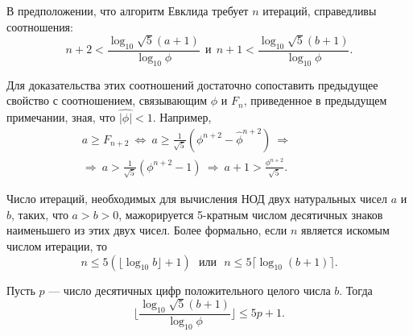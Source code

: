 \begin{property}
\hspace*{15pt}В предположении, что алгоритм Евклида требует $n$ итераций,  
справедливы соотношения: 
\begin{equation*}
n+2 < \frac{\log_{10}{\sqrt{5}(a+1)}}{\log_{10}{\phi}}\:\: \text{и} \:\: n+1 < \frac{\log_{10}{\sqrt{5}(b+1)}}{\log_{10}{\phi}}.
\end{equation*}
\end{property}

\begin{myproof}
Для доказательства этих соотношений достаточно сопоставить 
предыдущее свойство с соотношением, связывающим $\phi$ и $F_n$,  
приведенное в предыдущем примечании, зная, что $\hat{|\phi|} < 1$. Например, 
\begin{eqnarray*}
a \geqslant F_{n+2}\: \Leftrightarrow \: a \geqslant \frac{1}{\sqrt{5}}(\phi^{n+2} - \hat{\phi}^{n+2}) \: \Rightarrow \qquad\qquad \\
\Rightarrow \: a > \frac{1}{\sqrt{5}}(\phi^{n+2} - 1) \: \Rightarrow \: a+1 > \frac{\phi^{n+2}}{\sqrt{5}}.
\end{eqnarray*}
\end{myproof}

\begin{thm}[Ламе]
\hspace*{15pt}Число итераций, необходимых для вычисления $\text{НОД}$ двух  
натуральных чисел $a$ и $b$, таких, что $a > b > 0$, мажорируется 5-кратным числом 
десятичных знаков наименьшего из этих двух чисел. Более формально, 
если $n$ является искомым числом итерации, то
\begin{equation*}
n \leqslant 5(\lfloor \log_{10}{b} \rfloor + 1)\:\:\: \textit{или}\:\:\: n \leqslant 5 \lceil \log_{10}{(b+1)}\rceil.
\end{equation*}
\end{thm}

\begin{lemma}
\hspace*{15pt}Пусть $p$ — число десятичных цифр положительного целого числа $b$. 
Тогда 
\begin{equation*}
\lfloor \frac{\log_{10}{\sqrt{5}(b+1)}}{\log_{10}{\phi}} \rfloor \leqslant 5p + 1.
\end{equation*}
\end{lemma}
\pagebreak

